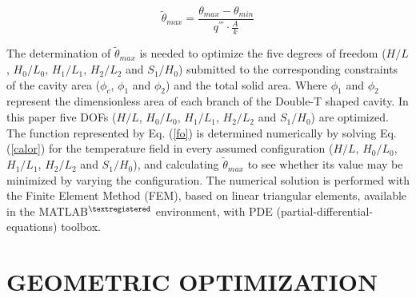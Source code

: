 \documentclass[12pt,fleqn]{article}
\begin{document}
\begin{equation}
\tilde{\theta}_{max}=\frac{\theta_{max}-\theta_{min}}{q^{'''}\cdot\frac{A}{k}}\label{fo}
\end{equation}

The determination of $\tilde{\theta}_{max}$ is needed to optimize the five degrees of freedom ($H/L$, $H_{0}/L_{0}$, $H_{1}/L_{1}$, $H_{2}/L_{2}$ and $S_{1}/H_{0}$) submitted to the corresponding constraints of the cavity area ($\phi_{c}$, $\phi_{1}$ and $\phi_{2}$) and the total solid area. Where $\phi_{1}$ and $\phi_{2}$ represent the dimensionless area of each branch of the Double-T shaped cavity. In this paper five DOFs ($H/L$, $H_{0}/L_{0}$, $H_{1}/L_{1}$, $H_{2}/L_{2}$ and $S_{1}/H_{0}$) are optimized. The function represented by Eq. (\ref{fo}) is determined numerically by solving Eq. (\ref{calor}) for the temperature field in every assumed configuration ($H/L$, $H_{0}/L_{0}$, $H_{1}/L_{1}$, $H_{2}/L_{2}$ and $S_{1}/H_{0}$), and calculating $\tilde{\theta}_{max}$ to see whether its value may be minimized by varying the configuration. The numerical solution is performed with the Finite Element Method (FEM)\citep{Reddy1994}, based on linear triangular elements, available in the MATLAB$^{\tiny ®}$ environment, with PDE (partial-differential-equations) toolbox. 


\section{GEOMETRIC OPTIMIZATION}
\end{document}
